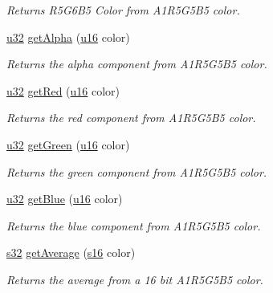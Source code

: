 \begin{DoxyCompactItemize}
\begin{DoxyCompactList}\small\item\em Returns R5\+G6\+B5 Color from A1\+R5\+G5\+B5 color. \end{DoxyCompactList}\item 
\hyperlink{namespaceirr_a0416a53257075833e7002efd0a18e804}{u32} \hyperlink{namespaceirr_1_1video_a23358b142a005c4a4c747d227a4d77ab}{get\+Alpha} (\hyperlink{namespaceirr_ae9f8ec82692ad3b83c21f555bfa70bcc}{u16} color)
\begin{DoxyCompactList}\small\item\em Returns the alpha component from A1\+R5\+G5\+B5 color. \end{DoxyCompactList}\item 
\hyperlink{namespaceirr_a0416a53257075833e7002efd0a18e804}{u32} \hyperlink{namespaceirr_1_1video_aa98234702c65c82ce29115b12e89dafe}{get\+Red} (\hyperlink{namespaceirr_ae9f8ec82692ad3b83c21f555bfa70bcc}{u16} color)
\begin{DoxyCompactList}\small\item\em Returns the red component from A1\+R5\+G5\+B5 color. \end{DoxyCompactList}\item 
\hyperlink{namespaceirr_a0416a53257075833e7002efd0a18e804}{u32} \hyperlink{namespaceirr_1_1video_a3e64185c36326ed33a494ba14cac00a5}{get\+Green} (\hyperlink{namespaceirr_ae9f8ec82692ad3b83c21f555bfa70bcc}{u16} color)
\begin{DoxyCompactList}\small\item\em Returns the green component from A1\+R5\+G5\+B5 color. \end{DoxyCompactList}\item 
\hyperlink{namespaceirr_a0416a53257075833e7002efd0a18e804}{u32} \hyperlink{namespaceirr_1_1video_ae8dc9edd5a3eb01de47933ac2d7f679e}{get\+Blue} (\hyperlink{namespaceirr_ae9f8ec82692ad3b83c21f555bfa70bcc}{u16} color)
\begin{DoxyCompactList}\small\item\em Returns the blue component from A1\+R5\+G5\+B5 color. \end{DoxyCompactList}\item 
\hyperlink{namespaceirr_ac66849b7a6ed16e30ebede579f9b47c6}{s32} \hyperlink{namespaceirr_1_1video_ab242fde6c6e19ae4100fe39b0dadd9d0}{get\+Average} (\hyperlink{namespaceirr_a43ace0af066371ac0862bac3f7314220}{s16} color)\hypertarget{namespaceirr_1_1video_ab242fde6c6e19ae4100fe39b0dadd9d0}{}\label{namespaceirr_1_1video_ab242fde6c6e19ae4100fe39b0dadd9d0}

\begin{DoxyCompactList}\small\item\em Returns the average from a 16 bit A1\+R5\+G5\+B5 color. \end{DoxyCompactList}\end{DoxyCompactItemize}

